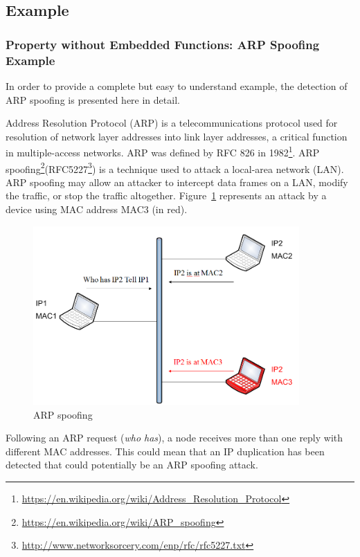 
\subsection{Example}
\subsubsection{Property without Embedded Functions: ARP Spoofing Example}
\label{arp_example}
In order to provide a complete but easy to understand example, the detection of ARP spoofing is presented here in detail. 

 Address Resolution Protocol (ARP) is a telecommunications protocol used for resolution of network layer addresses into link layer addresses, a critical function in multiple-access networks. ARP was defined by RFC 826 in 1982\footnote{\url{https://en.wikipedia.org/wiki/Address_Resolution_Protocol}}. 
ARP spoofing\footnote{\url{https://en.wikipedia.org/wiki/ARP_spoofing}}(RFC5227\footnote{\url{http://www.networksorcery.com/enp/rfc/rfc5227.txt}}) is a technique used to attack a local-area network (LAN). ARP spoofing may allow an attacker to intercept data frames on a LAN, modify the traffic, or stop the traffic altogether. Figure~\ref{arp} represents an attack by a device using MAC address MAC3 (in red).

\begin{figure}[H]
\centering
\includegraphics[width=4in]{img/arp_example.png}
\caption{ARP spoofing}\label{arp}
\end{figure}

 Following an ARP request (\textit{who has}), a node receives more than one reply with different MAC addresses. This could mean that an IP duplication has been detected that could potentially be an ARP spoofing attack.

